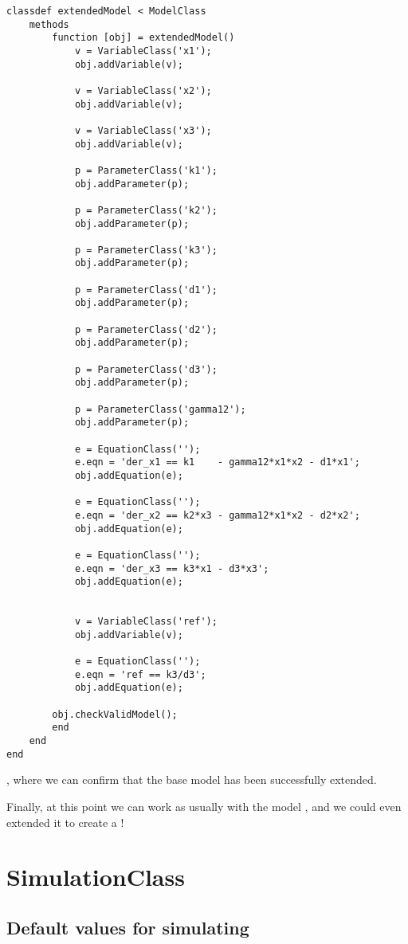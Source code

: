 \documentclass[11pt]{article}
\begin{document}
\begin{lstlisting}
classdef extendedModel < ModelClass
	methods
		function [obj] = extendedModel()
			v = VariableClass('x1');
			obj.addVariable(v);

			v = VariableClass('x2');
			obj.addVariable(v);

			v = VariableClass('x3');
			obj.addVariable(v);

			p = ParameterClass('k1');
			obj.addParameter(p);

			p = ParameterClass('k2');
			obj.addParameter(p);

			p = ParameterClass('k3');
			obj.addParameter(p);

			p = ParameterClass('d1');
			obj.addParameter(p);

			p = ParameterClass('d2');
			obj.addParameter(p);

			p = ParameterClass('d3');
			obj.addParameter(p);

			p = ParameterClass('gamma12');
			obj.addParameter(p);

			e = EquationClass('');
			e.eqn = 'der_x1 == k1    - gamma12*x1*x2 - d1*x1';
			obj.addEquation(e);

			e = EquationClass('');
			e.eqn = 'der_x2 == k2*x3 - gamma12*x1*x2 - d2*x2';
			obj.addEquation(e);

			e = EquationClass('');
			e.eqn = 'der_x3 == k3*x1 - d3*x3';
			obj.addEquation(e);


			v = VariableClass('ref');
			obj.addVariable(v);

			e = EquationClass('');
			e.eqn = 'ref == k3/d3';
			obj.addEquation(e);

		obj.checkValidModel();
		end
	end
end
\end{lstlisting}

, where we can confirm that the base model has been successfully extended.

Finally, at this point we can work as usually with the model , and we could even extended it to create a !

\section{SimulationClass}

\subsection{Default values for simulating}
\end{document}
